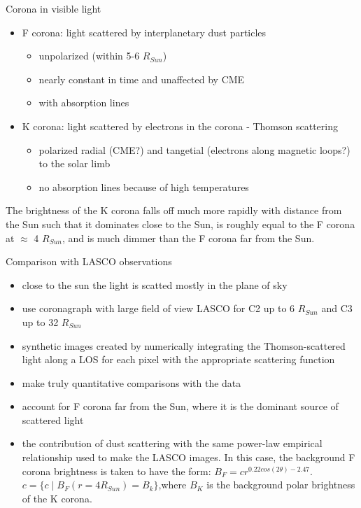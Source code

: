 \documentclass{beamer}
\begin{document}
\begin{frame}{Corona in visible light}

\begin{itemize}
\item F corona: light scattered by interplanetary dust particles 
\begin{itemize}
\item unpolarized (within 5-6 $R_{Sun}$)
\item  nearly constant in time and unaffected by CME
\item with absorption lines
\end{itemize}
\item K corona: light scattered by electrons in the corona - Thomson scattering 
\begin{itemize}
\item polarized radial (CME?) and tangetial (electrons along magnetic loops?) to the solar limb
\item no absorption lines because of high temperatures
\end{itemize}

\end{itemize}

The brightness of the K corona falls off much more
rapidly with distance from the Sun such that it dominates close to
the Sun, is roughly equal to the F corona at $\approx$ 4 $R_{Sun}$, and is much
dimmer than the F corona far from the Sun. 


\end{frame}



\begin{frame}{Comparison with LASCO observations}

\begin{itemize}
\item close to the sun the light is scatted mostly in the plane of sky
\item use coronagraph with large field of view LASCO for  C2 up to 6 $R_{Sun}$ and C3 up to 32 $R_{Sun}$
\item  synthetic images created by numerically
integrating the Thomson-scattered light along a LOS for each
pixel with the appropriate scattering function
\item make truly quantitative comparisons with the data
\item account for F corona far
from the Sun, where it is the dominant source of scattered light
\item the contribution of dust scattering with the
same power-law empirical relationship used to make the LASCO
images. In this case, the background F corona brightness is taken
to have the form: $B_F = c r^{0.22 cos(2\theta) - 2.47} $. 
$c = \{c \mid B_F(r = 4 R_{Sun}) = B_k  \}$,where  $B_K$ is the background polar brightness of
the K corona.

\end{itemize}

\end{frame}
\end{document}
